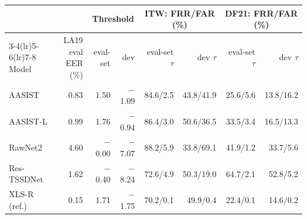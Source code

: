 \begin{tabular}{@{}lrrrrrrr@{}}
\toprule
 & & \multicolumn{2}{c}{Threshold} & \multicolumn{2}{c}{ITW: FRR/FAR (\%)} & \multicolumn{2}{c}{DF21: FRR/FAR (\%)} \\
\cmidrule(lr){3-4}\cmidrule(lr){5-6}\cmidrule(lr){7-8}
Model & LA19 eval EER (\%) & eval-set & dev & eval-set $\tau$ & dev $\tau$ & eval-set $\tau$ & dev $\tau$ \\
\midrule
AASIST & 0.83 & 1.50 & $-$1.09 & 84.6/2.5 & 43.8/41.9 & 25.6/5.6 & 13.8/16.2 \\
AASIST-L & 0.99 & 1.76 & $-$0.94 & 86.4/3.0 & 50.6/36.5 & 33.5/3.4 & 16.5/13.3 \\
RawNet2 & 4.60 & $-$0.00 & $-$7.07 & 88.2/5.9 & 33.8/69.1 & 41.9/1.2 & 33.7/5.6 \\
Res-TSSDNet & 1.62 & $-$0.40 & $-$8.24 & 72.6/4.9 & 50.3/19.0 & 64.7/2.1 & 52.8/5.2 \\
XLS-R (ref.) & 0.15 & 1.71 & $-$1.75 & 70.2/0.1 & 49.9/0.4 & 22.4/0.1 & 14.6/0.2 \\
\bottomrule
\end{tabular}
